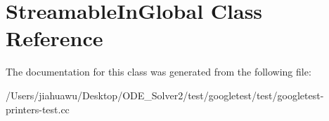 \hypertarget{class_streamable_in_global}{}\section{Streamable\+In\+Global Class Reference}
\label{class_streamable_in_global}


The documentation for this class was generated from the following file\+:\begin{DoxyCompactItemize}
\item 
/\+Users/jiahuawu/\+Desktop/\+O\+D\+E\+\_\+\+Solver2/test/googletest/test/googletest-\/printers-\/test.\+cc\end{DoxyCompactItemize}
